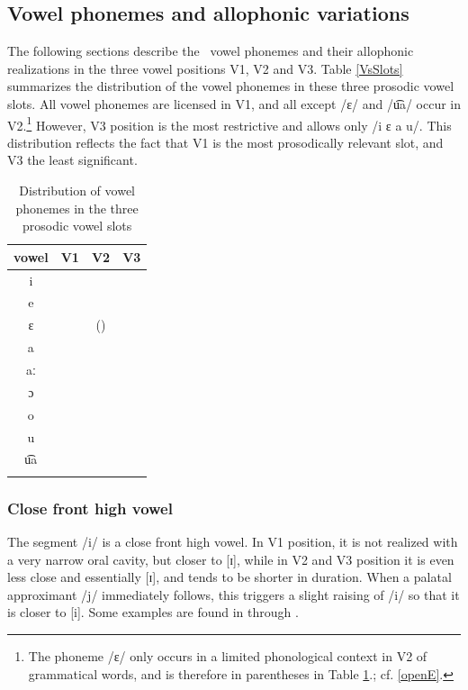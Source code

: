 \subsection{Vowel phonemes and allophonic variations}\label{Vallophones}
The following sections describe the \PS\ vowel phonemes and their allophonic realizations in the three vowel positions V1, V2 and V3. Table \vref{VsSlots} 
summarizes the distribution of the vowel phonemes in these three prosodic vowel slots.
All vowel phonemes are licensed in V1, and all except /ɛ/ and /u͡a/ occur in V2.\footnote{The phoneme /ɛ/ only occurs in a limited phonological context in V2 of grammatical words, and is therefore in parentheses in Table \ref{VsSlots}.; cf. \SEC\ref{openE}.} 
However, V3 position is the most restrictive and allows only /i ɛ a u/. This distribution reflects the fact that V1 is the most prosodically relevant slot, and V3 the least significant.
\begin{table}[h]\centering
\caption[Distribution of vowel phonemes in the prosodic vowel slots]{Distribution of vowel phonemes in the three prosodic vowel slots}\label{VsSlots}
\begin{tabular}{ c  c  c  c }\mytoprule
{vowel} &{V1}	&{V2}	&{V3}	\\\hline
i	&\PLUS	&\PLUS	&\PLUS	\\
e	&\PLUS	&\PLUS	&\MINUS	\\
ɛ	&\PLUS	&(\MINUS)&\PLUS	\\
a	&\PLUS	&\PLUS	&\PLUS	\\
aː	&\PLUS	&\PLUS	&\MINUS	\\
ɔ	&\PLUS	&\PLUS	&\MINUS	\\
o	&\PLUS	&\PLUS	&\MINUS	\\
u	&\PLUS	&\PLUS	&\PLUS	\\
u͡a	&\PLUS	&\MINUS	&\MINUS	\\\mybottomrule
\end{tabular}
\end{table}


\subsubsection{Close front high vowel}
The segment /i/ is a close front high vowel. In V1 position, it is not realized with a very narrow oral cavity, but closer to [ɪ], while in V2 and V3 position it is even less close and essentially [ɪ], and tends to be shorter in duration. When a palatal approximant /j/ immediately follows, this triggers a slight raising of /i/ so that it is closer to [i]. 
Some examples are found in  through .


